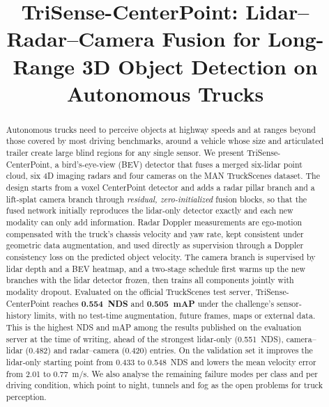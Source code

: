 \documentclass[conference]{IEEEtran}
\newcommand{\method}{TriSense-CenterPoint}
\begin{document}
\title{\method: Lidar--Radar--Camera Fusion for Long-Range 3D Object Detection on Autonomous Trucks}

\author{
}

\maketitle

\begin{abstract}
Autonomous trucks need to perceive objects at highway speeds and at ranges beyond those covered by most driving
benchmarks, around a vehicle whose size and articulated trailer create large blind regions for any single sensor.
We present \method, a bird's-eye-view (BEV) detector that fuses a merged six-lidar point cloud, six 4D imaging radars
and four cameras on the MAN TruckScenes dataset. The design starts from a voxel CenterPoint detector and adds a radar
pillar branch and a lift-splat camera branch through \emph{residual, zero-initialized} fusion blocks, so that the
fused network initially reproduces the lidar-only detector exactly and each new modality can only add information.
Radar Doppler measurements are ego-motion compensated with the truck's chassis velocity and yaw rate, kept
consistent under geometric data augmentation, and used directly as supervision through a Doppler consistency loss
on the predicted object velocity. The camera branch is supervised by lidar depth and a BEV heatmap, and a two-stage
schedule first warms up the new branches with the lidar detector frozen, then trains all components jointly with
modality dropout. Evaluated on the official TruckScenes test server, \method{} reaches \textbf{0.554~NDS} and
\textbf{0.505~mAP} under the challenge's sensor-history limits, with no test-time augmentation, future frames, maps
or external data. This is the highest NDS and mAP among the results published on the evaluation server at the time
of writing, ahead of the strongest lidar-only (0.551~NDS), camera--lidar (0.482) and radar--camera (0.420) entries. On the validation set it improves the lidar-only starting point from 0.433 to 0.548~NDS and lowers the
mean velocity error from 2.01 to 0.77~m/s. We also analyse the remaining failure modes per class and per driving
condition, which point to night, tunnels and fog as the open problems for truck perception.
\end{abstract}
\end{document}
